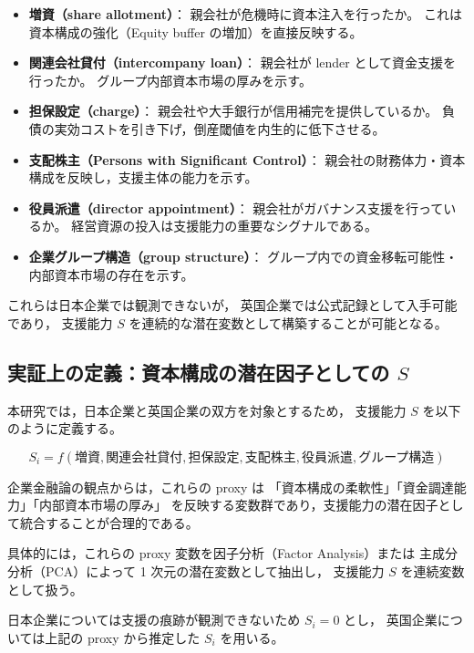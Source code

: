 \begin{itemize}
    \item \textbf{増資（share allotment）}：
          親会社が危機時に資本注入を行ったか。  
          これは資本構成の強化（Equity buffer の増加）を直接反映する。
    \item \textbf{関連会社貸付（intercompany loan）}：
          親会社が lender として資金支援を行ったか。  
          グループ内部資本市場の厚みを示す。
    \item \textbf{担保設定（charge）}：
          親会社や大手銀行が信用補完を提供しているか。  
          負債の実効コストを引き下げ，倒産閾値を内生的に低下させる。
    \item \textbf{支配株主（Persons with Significant Control）}：
          親会社の財務体力・資本構成を反映し，支援主体の能力を示す。
    \item \textbf{役員派遣（director appointment）}：
          親会社がガバナンス支援を行っているか。  
          経営資源の投入は支援能力の重要なシグナルである。
    \item \textbf{企業グループ構造（group structure）}：
          グループ内での資金移転可能性・内部資本市場の存在を示す。
\end{itemize}

これらは日本企業では観測できないが，
英国企業では公式記録として入手可能であり，
支援能力 $S$ を連続的な潜在変数として構築することが可能となる。

\subsection{実証上の定義：資本構成の潜在因子としての $S$}

本研究では，日本企業と英国企業の双方を対象とするため，
支援能力 $S$ を以下のように定義する。



\[
S_i = f(\text{増資}, \text{関連会社貸付}, \text{担保設定}, 
       \text{支配株主}, \text{役員派遣}, \text{グループ構造})
\]



企業金融論の観点からは，これらの proxy は
「資本構成の柔軟性」「資金調達能力」「内部資本市場の厚み」
を反映する変数群であり，支援能力の潜在因子として統合することが合理的である。

具体的には，これらの proxy 変数を因子分析（Factor Analysis）または
主成分分析（PCA）によって 1 次元の潜在変数として抽出し，
支援能力 $S$ を連続変数として扱う。

日本企業については支援の痕跡が観測できないため $S_i = 0$ とし，
英国企業については上記の proxy から推定した $S_i$ を用いる。

